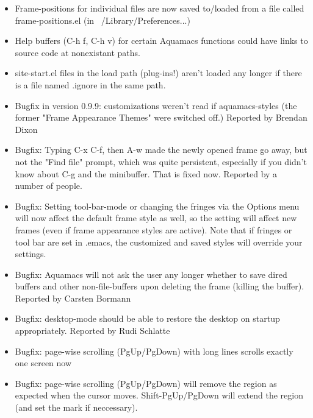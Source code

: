\begin{itemize}
\item  Frame-positions for individual files are now saved to/loaded
        from a file called frame-positions.el (in ~/Library/Preferences...)


\item  Help buffers (C-h f, C-h v) for certain Aquamacs functions could
        have links to source code at nonexistant paths.

\item  site-start.el files in the load path (plug-ins!) aren't loaded
        any longer if there is a file named .ignore in the same path.

\item  Bugfix in version 0.9.9: customizations weren't read if
        aquamacs-styles (the former "Frame Appearance Themes" were
        switched off.)
        Reported by Brendan Dixon


\item  Bugfix: Typing C-x C-f, then A-w made the newly opened frame go
        away, but not the "Find file" prompt, which was quite persistent,
        especially if you didn't know about C-g and the minibuffer. That
        is fixed now.
        Reported by a number of people.

\item  Bugfix: Setting tool-bar-mode or changing the fringes via the
        Options menu will now affect the default frame style as well, so
        the setting will affect new frames (even if frame appearance
        styles are active). Note that if fringes or tool bar are set in
        .emacs, the customized and saved styles will override your
        settings.

\item  Bugfix: Aquamacs will not ask the user any longer whether to
        save dired buffers and other non-file-buffers upon deleting the
        frame (killing the buffer).
        Reported by Carsten Bormann

\item  Bugfix: desktop-mode should be able to restore the desktop on
        startup appropriately.
        Reported by Rudi Schlatte

\item  Bugfix: page-wise scrolling (PgUp/PgDown) with long lines
        scrolls exactly one screen now

\item  Bugfix: page-wise scrolling (PgUp/PgDown) will remove the region
        as expected when the cursor moves. Shift-PgUp/PgDown will extend
        the region (and set the mark if neccessary).


\end{itemize}
